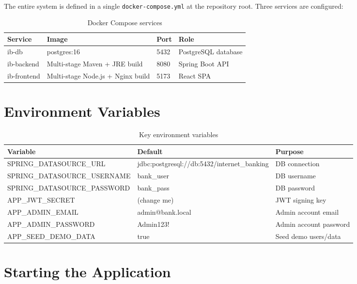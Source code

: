 \documentclass[12pt,a4paper]{report}
\begin{document}
The entire system is defined in a single \texttt{docker-compose.yml} at the repository
root. Three services are configured:

\begin{table}[H]
  \centering
  \caption{Docker Compose services}
  \begin{tabular}{llll}
    \toprule
    \textbf{Service} & \textbf{Image} & \textbf{Port} & \textbf{Role} \\
    \midrule
    ib-db       & postgres:16                       & 5432 & PostgreSQL database \\
    ib-backend  & Multi-stage Maven + JRE build     & 8080 & Spring Boot API \\
    ib-frontend & Multi-stage Node.js + Nginx build & 5173 & React SPA \\
    \bottomrule
  \end{tabular}
\end{table}

\section{Environment Variables}

\begin{table}[H]
  \centering
  \caption{Key environment variables}
  \begin{tabular}{lll}
    \toprule
    \textbf{Variable} & \textbf{Default} & \textbf{Purpose} \\
    \midrule
    SPRING\_DATASOURCE\_URL      & jdbc:postgresql://db:5432/internet\_banking & DB connection \\
    SPRING\_DATASOURCE\_USERNAME & bank\_user  & DB username \\
    SPRING\_DATASOURCE\_PASSWORD & bank\_pass  & DB password \\
    APP\_JWT\_SECRET             & (change me) & JWT signing key \\
    APP\_ADMIN\_EMAIL            & admin@bank.local & Admin account email \\
    APP\_ADMIN\_PASSWORD         & Admin123!   & Admin account password \\
    APP\_SEED\_DEMO\_DATA        & true        & Seed demo users/data \\
    \bottomrule
  \end{tabular}
\end{table}

\section{Starting the Application}
\end{document}
